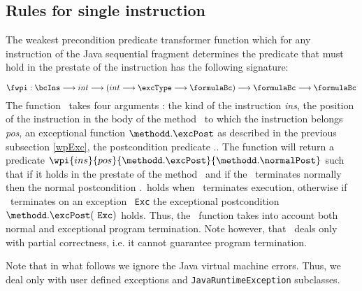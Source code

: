\subsection{Rules for single instruction}
The weakest precondition predicate transformer function which for any instruction of the Java sequential fragment
determines the predicate that must hold in the prestate of the instruction has the following signature:

$$ \fwpi :  \bcIns \longrightarrow  int  \longrightarrow ( int \longrightarrow  \excType \longrightarrow  \formulaBc) \longrightarrow \formulaBc \longrightarrow \formulaBc $$
The function \fwpi \ takes four arguments : the kind of the instruction \textit{ins}, the position of the instruction in the body of the method \methodd \ to which the
instruction belongs \textit{pos},
an exceptional function $\methodd.\excPost$ as described in the previous subsection \ref{wpExc}, 
the postcondition predicate \methodd.\normalPost.
The function will return a predicate $\wpi{ins}{pos}{\methodd.\excPost}{\methodd.\normalPost}$ such that  if it holds in the prestate of the method \methodd \  and if the
\methodd \ terminates normally then the normal postcondition \methodd.\normalPost \ holds when  \methodd \ terminates execution, otherwise if \methodd \ terminates on an exception
  \mbox{ \rm \texttt{Exc}} the exceptional postcondition  $ \methodd.\excPost( \mbox{ \rm \texttt{Exc}} )$ holds. 
Thus, the \fwpi \ function takes into account both normal and exceptional program termination. Note however, that \fwpi \ deals only with partial correctness, i.e.
 it cannot guarantee program termination.




Note that in what follows we ignore the  Java virtual machine errors. Thus, we deal only with user defined exceptions and
 \texttt{JavaRuntimeException} subclasses.

